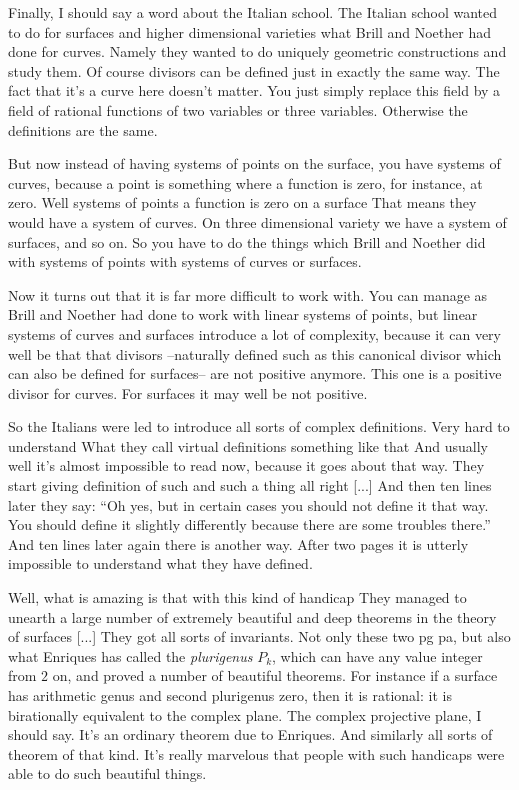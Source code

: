\documentclass{article}
\begin{document}
Finally, I should say a word about the Italian school.
The Italian school wanted to do for surfaces and higher dimensional varieties
what Brill and Noether had done for curves.
Namely they wanted to do uniquely geometric constructions and study them.
Of course divisors can be defined just in exactly the same way.
The fact that it's a curve here doesn't matter.
You just simply replace this field 
by a field of rational functions of two variables or three variables.
Otherwise the definitions are the same.

But now instead of having systems of points on the surface,
you have systems of curves,
because a point is something where a function is zero, for instance, at zero.
Well systems of points a function is zero on a surface
That means they would have a system of curves.
On three dimensional variety we have a system of surfaces, and so on.
So you have to do the things which Brill and Noether did 
with systems of points
with systems of curves or surfaces.

Now it turns out that it is far more difficult to work with.
You can manage as Brill and Noether had done
to work with linear systems of points,
but linear systems of curves and surfaces introduce a lot of complexity,
because it can very well be that that divisors
--naturally defined such as this canonical divisor
which can also be defined for surfaces--
are not positive anymore.
This one is a positive divisor for curves. 
For surfaces it may well be not positive.

So the Italians were led to introduce 
all sorts of complex definitions.
Very hard to understand
What they call virtual definitions something like that
And usually well it's almost impossible to read now,
because it goes about that way.
They start giving definition of such and such a thing all right [...]
And then ten lines later they say: 
``Oh yes, but in certain cases you should not define it that way.
You should define it slightly differently 
because there are some troubles there.''
And ten lines later again there is another way.
After two pages it is utterly impossible 
to understand what they have defined.

Well,  what is amazing is that with this kind of handicap
They managed to unearth a large number 
of extremely beautiful and deep theorems
in the theory of surfaces [...]
They got all sorts of invariants.
Not only these two pg pa,
but also what Enriques has called the \emph{plurigenus} $P_k$,
which can have any value integer from $2$ on,
and proved a number of beautiful theorems.
For instance if a surface has arithmetic genus and second plurigenus zero,
then it is rational: 
it is birationally equivalent to the complex plane.
The complex projective plane, I should say.
It's an ordinary theorem due to Enriques.
And similarly all sorts of theorem of that kind.
It's really marvelous 
that people with such handicaps 
were able to do such beautiful things.
\end{document}
